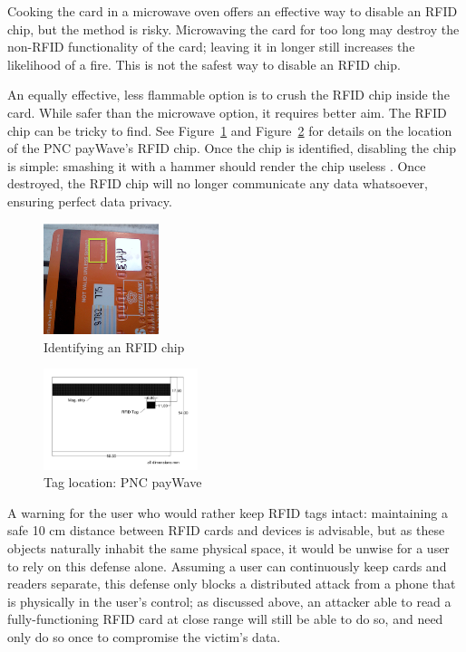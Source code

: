 \documentclass{sig-alternate}
\begin{document}
Cooking the card in a microwave oven offers an effective way to disable an RFID chip, but the method is risky.  Microwaving the card for too long may destroy the non-RFID functionality of the card; leaving it in longer still increases the likelihood of a fire.  This is not the safest way to disable an RFID chip.

An equally effective, less flammable option is to crush the RFID chip inside the card.  While safer than the microwave option, it requires better aim.  The RFID chip can be tricky to find.  See Figure~\ref{fig:RFID_in_PNC_Card} and Figure~\ref{fig:RFID_chip_location} for details on the location of the PNC payWave's RFID chip.  Once the chip is identified, disabling the chip is simple: smashing it with a hammer should render the chip useless \cite{threat-analysis-of-rfid-passports}.  Once destroyed, the RFID chip will no longer communicate any data whatsoever, ensuring perfect data privacy.

       \begin{figure}%
         \centering
         \includegraphics[width=0.3\textwidth]{images/RFID_in_PNC_Card.png}
         \caption{Identifying an RFID chip}
         \label{fig:RFID_in_PNC_Card}
       \end{figure}

       \begin{figure}%
         \centering
         \includegraphics[width=0.4\textwidth]{images/RFID_chip_location.png}
         \caption{Tag location: PNC payWave}
         \label{fig:RFID_chip_location}
       \end{figure}

A warning for the user who would rather keep RFID tags intact: maintaining a safe 10 cm distance between RFID cards and devices is advisable, but as these objects naturally inhabit the same physical space, it would be unwise for a user to rely on this defense alone.  Assuming a user can continuously keep cards and readers separate, this defense only blocks a distributed attack from a phone that is physically in the user's control; as discussed above, an attacker able to read a fully-functioning RFID card at close range will still be able to do so, and need only do so once to compromise the victim's data.
\end{document}
